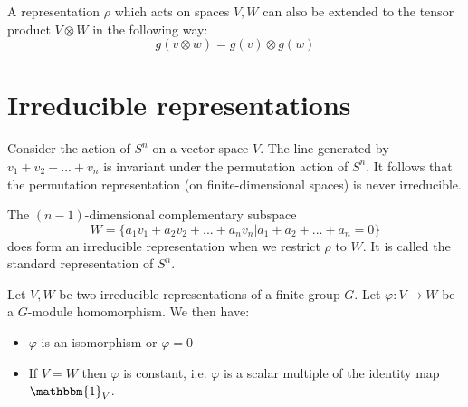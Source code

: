         \begin{example}
        	A representation $\rho$ which acts on spaces $V, W$ can also be extended to the tensor product  $V\otimes W$ in the following way:
            \begin{equation}
            	g(v\otimes w) = g(v)\otimes g(w)
            \end{equation}
        \end{example}

\section{Irreducible representations}

	
	\begin{example}
		Consider the action of $S^n$ on a vector space $V$. The line generated by $v_1+v_2+...+v_n$ is invariant under the permutation action of $S^n$. It follows that the permutation representation (on finite-dimensional spaces) is never irreducible.
		
		The $(n-1)$-dimensional complementary subspace
		\begin{equation}
			W = \{a_1v_1 + a_2v_2 + ... + a_nv_n|a_1 + a_2 + ... + a_n = 0\}
		\end{equation}
		does form an irreducible representation when we restrict $\rho$ to $W$. It is called the standard representation of $S^n$.
	\end{example}
        
        \begin{theorem}
        	Let $V, W$ be two irreducible representations of a finite group $G$. Let $\varphi: V\rightarrow W$ be a $G$-module homomorphism. We then have:
            \begin{itemize}
	            \item $\varphi$ is an isomorphism or $\varphi = 0$
                \item If $V = W$ then $\varphi$ is constant, i.e. $\varphi$ is a scalar multiple of the identity map $\mathbbm{1}_V$.
            \end{itemize}
        \end{theorem}
        
